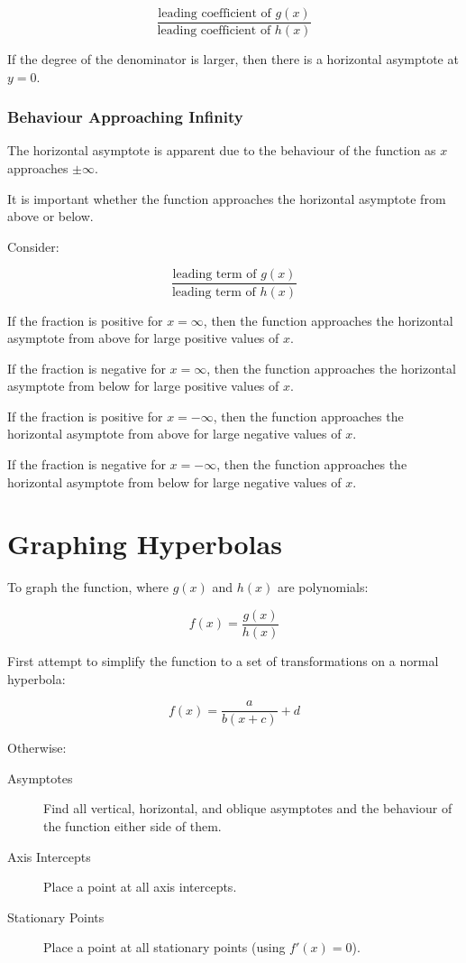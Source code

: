 \documentclass[a4paper,11pt]{article}
\begin{document}
$$
\frac{\text{leading coefficient of $g(x)$}}{\text{leading coefficient of $h(x)$}}
$$

If the degree of the denominator is larger, then there is a horizontal
asymptote at $y = 0$.


\subsubsection{Behaviour Approaching Infinity}

The horizontal asymptote is apparent due to the behaviour of the function as
$x$ approaches $\pm \infty$.

It is important whether the function approaches the horizontal asymptote from
above or below.

Consider:

$$
\frac{\text{leading term of $g(x)$}}{\text{leading term of $h(x)$}}
$$

If the fraction is positive for $x = \infty$, then the function approaches the
horizontal asymptote from above for large positive values of $x$.

If the fraction is negative for $x = \infty$, then the function approaches the
horizontal asymptote from below for large positive values of $x$.

If the fraction is positive for $x = -\infty$, then the function approaches the
horizontal asymptote from above for large negative values of $x$.

If the fraction is negative for $x = -\infty$, then the function approaches the
horizontal asymptote from below for large negative values of $x$.




\section{Graphing Hyperbolas}

To graph the function, where $g(x)$ and $h(x)$ are polynomials:

$$
f(x) = \frac{g(x)}{h(x)}
$$

First attempt to simplify the function to a set of transformations on a normal
hyperbola:

$$
f(x) = \frac{a}{b(x + c)} + d
$$

Otherwise:

\begin{description}
\item [Asymptotes] Find all vertical, horizontal, and oblique asymptotes and
	the behaviour of the function either side of them.
\item [Axis Intercepts] Place a point at all axis intercepts.
\item [Stationary Points] Place a point at all stationary points (using
	$f'(x) = 0$).
\end{description}
\end{document}
